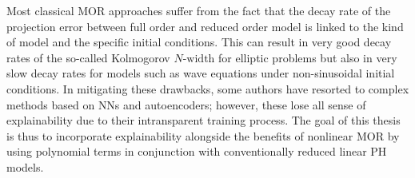 Most classical \acl{MOR} approaches suffer from the fact that the decay rate of the projection error between full order and reduced order model is linked to the kind of model and the specific initial conditions.
This can result in very good decay rates of the so-called Kolmogorov $N\text{-width}$ for elliptic problems but also in very slow decay rates for models such as wave equations under non-sinusoidal initial conditions.
In mitigating these drawbacks, some authors have resorted to complex methods based on \aclp{NN} and autoencoders; however, these lose all sense of explainability due to their intransparent training process.
The goal of this thesis is thus to incorporate explainability alongside the benefits of nonlinear \acl{MOR} by using polynomial terms in conjunction with conventionally reduced linear \acl{PH} models.
